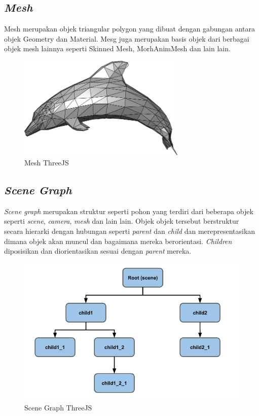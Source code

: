 \subsection{\emph{Mesh}}
Mesh merupakan objek triangular polygon yang dibuat dengan gabungan antara objek Geometry dan  Material. Mesg juga merupakan basis objek dari berbagai objek mesh lainnya seperti Skinned Mesh, MorhAnimMesh dan lain lain.
\begin{figure}[H]
	\centering
	\includegraphics[keepaspectratio, width=8cm]{gambar/mesh.png}
	\caption{Mesh ThreeJS}
	\label{gambar:mesh.png}
\end{figure}

\subsection{\emph{Scene Graph}}
\textit{Scene graph} merupakan struktur seperti pohon yang terdiri dari beberapa objek seperti \textit{scene}, \textit{camera}, \textit{mesh} dan lain lain. Objek objek tersebut berstruktur secara hierarki dengan hubungan seperti \textit{parent} dan \textit{child} dan merepresentasikan dimana objek akan muncul dan bagaimana mereka berorientasi. \textit{Children} diposisikan dan diorientasikan sesuai dengan \textit{parent} mereka. 

\begin{figure}[H]
	\centering
	\includegraphics[keepaspectratio, width=12cm]{gambar/tree-graph-three}
	\caption{Scene Graph ThreeJS}
	\label{gambar:tree-graph-three.png}
\end{figure}

